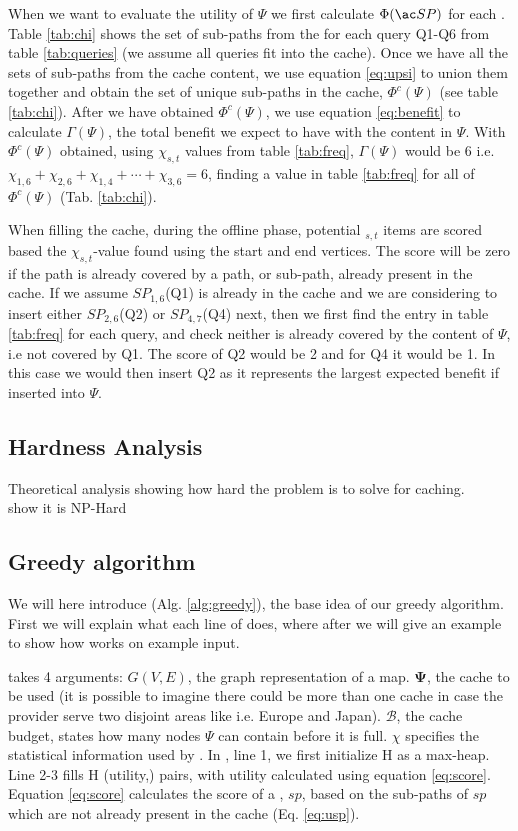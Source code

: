 When we want to evaluate the utility of $\Psi$ we first calculate $\Phi(\spath)$ for each \spathns. Table \ref{tab:chi} shows the set of sub-paths from the \spaths for each query Q1-Q6 from table \ref{tab:queries} (we assume all queries fit into the cache). Once we have all the sets of sub-paths from the cache content, we use equation \ref{eq:upsi} to union them together and obtain the set of unique sub-paths in the cache, $\Phi^c(\Psi)$ (see table \ref{tab:chi}). After we have obtained $\Phi^c(\Psi)$, we use equation \ref{eq:benefit} to calculate $\Gamma(\Psi)$, the total benefit we expect to have with the content in $\Psi$. With $\Phi^c(\Psi)$ obtained, using $\chi_{s,t}$ values from table \ref{tab:freq}, $\Gamma(\Psi)$ would be 6 i.e. $\chi_{1,6}+\chi_{2,6}+\chi_{1,4}+\dotsb+\chi_{3,6} = 6$, finding a value in table \ref{tab:freq} for all \spaths of $\Phi^c(\Psi)$ (Tab. \ref{tab:chi}).

When filling the cache, during the offline phase, potential \spath$_{s,t}$ items are scored based the $\chi_{s,t}$-value found using the \spath start and end vertices. The score will be zero if the path is already covered by a path, or sub-path, already present in the cache. If we assume $SP_{1,6}$(Q1) is already in the cache and we are considering to insert either $SP_{2,6}$(Q2) or $SP_{4,7}$(Q4) next, then we first find the entry in table \ref{tab:freq} for each query, and check neither is already covered by the content of $\Psi$, i.e not covered by Q1. The score of Q2 would be 2 and for Q4 it would be 1. In this case we would then insert Q2 as it represents the largest expected benefit if inserted into $\Psi$.

\subsection{Hardness Analysis}
Theoretical analysis showing how hard the problem is to solve for \spath caching.\\
show it is NP-Hard
 

\subsection{Greedy algorithm}
We will here introduce \salgo (Alg. \ref{alg:greedy}), the base idea of our greedy algorithm. First we will explain what each line of \salgo does, where after we will give an example to show how \salgo works on example input.

\salgo takes 4 arguments: $G(V,E)$, the graph representation of a map. $\mathbf{\Psi}$, the cache to be used (it is possible to imagine there could be more than one cache in case the \spath provider serve two disjoint areas like i.e. Europe and Japan). $\mathcal{B}$, the cache budget, states how many nodes $\Psi$ can contain before it is full. $\chi$ specifies the statistical information used by \salgons. 
In \salgons, line 1, we first initialize H as a max-heap. Line 2-3 fills H (utility,\spath) pairs, with utility calculated using equation \ref{eq:score}. 
Equation \ref{eq:score} calculates the score of a \spathns, $sp$, based on the sub-paths of $sp$ which are not already present in the cache (Eq. \ref{eq:usp}).

